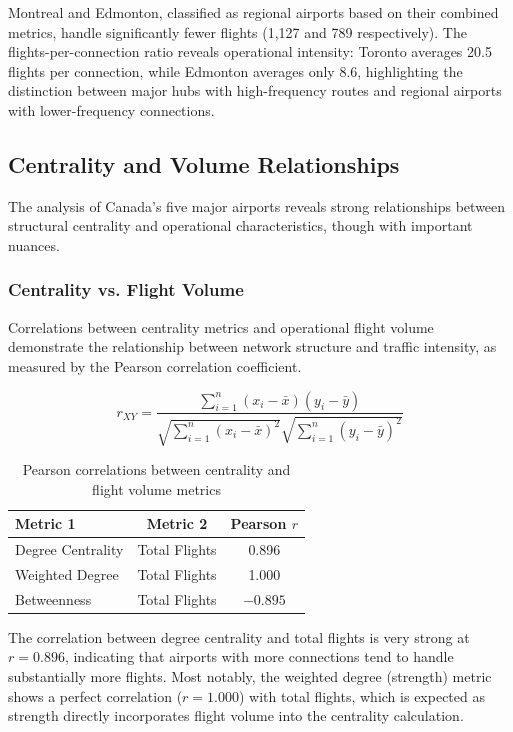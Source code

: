 \documentclass[9pt]{article}
\begin{document}
Montreal and Edmonton, classified as regional airports based on their combined metrics, handle significantly fewer flights (1,127 and 789 respectively). The flights-per-connection ratio reveals operational intensity: Toronto averages 20.5 flights per connection, while Edmonton averages only 8.6, highlighting the distinction between major hubs with high-frequency routes and regional airports with lower-frequency connections.

\subsection{Centrality and Volume Relationships}

The analysis of Canada's five major airports reveals strong relationships between structural centrality and operational characteristics, though with important nuances.

\subsubsection{Centrality vs. Flight Volume}

Correlations between centrality metrics and operational flight volume demonstrate the relationship between network structure and traffic intensity, as measured by the Pearson correlation coefficient.

\[
r_{XY}
=
\frac{\displaystyle\sum_{i=1}^{n} (x_i - \bar{x})(y_i - \bar{y})}
     {\sqrt{\displaystyle\sum_{i=1}^{n} (x_i - \bar{x})^2}
      \sqrt{\displaystyle\sum_{i=1}^{n} (y_i - \bar{y})^2}}
\]

\begin{table}[h!]
    \centering
    \caption{Pearson correlations between centrality and flight volume metrics}
    \begin{tabular}{lcc}
        \toprule
        Metric 1 & Metric 2 & Pearson $r$ \\
        \midrule
        Degree Centrality & Total Flights      & 0.896 \\
        Weighted Degree   & Total Flights      & 1.000 \\
        Betweenness       & Total Flights      & $-0.895$ \\
        \bottomrule
    \end{tabular}
\end{table}

The correlation between degree centrality and total flights is very strong at $r = 0.896$, indicating that airports with more connections tend to handle substantially more flights. Most notably, the weighted degree (strength) metric shows a perfect correlation ($r = 1.000$) with total flights, which is expected as strength directly incorporates flight volume into the centrality calculation.
\end{document}
